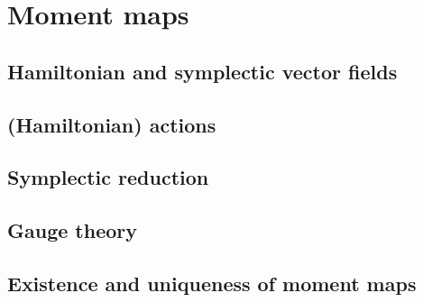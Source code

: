 \section{Moment maps}

\subsection{Hamiltonian and symplectic vector fields}

\subsection{(Hamiltonian) actions}

\subsection{Symplectic reduction}

\subsection{Gauge theory}

\subsection{Existence and uniqueness of moment maps}
